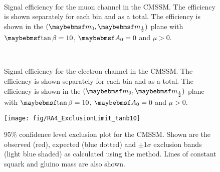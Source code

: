 \begin{figure}[h!]
\centering
{}
\\
\caption[Signal efficiency for the muon channel in the \ac{CMSSM}]{Signal
  efficiency for the muon channel in the \ac{CMSSM}. The efficiency is shown
  separately for each \STlep bin and as a total. The efficiency is shown in the
  $(\Mzero, \Mhalf)$ plane with $\tanbeta=10$, $\Azero=0$ and $\mu > 0$.}
\label{fig:inter_msugra_mu}
\end{figure}

\begin{figure}[h!]
\centering
{}
\\
\caption[Signal efficiency for the electron channel in the \ac{CMSSM}]{Signal
  efficiency for the electron channel in the \ac{CMSSM}. The efficiency is shown
  separately for each \STlep bin and as a total. The efficiency is shown in the
  $(\Mzero, \Mhalf)$ plane with $\tanbeta=10$, $\Azero=0$ and $\mu > 0$.}
\label{fig:inter_msugra_el}
\end{figure}

\begin{figure}[h!]
\texttt{[image: fig/RA4\_ExclusionLimit\_tanb10]}
\caption[95\% confidence level exclusion plot for the \ac{CMSSM}]{95\% confidence level exclusion plot for the
  \ac{CMSSM}. Shown are the observed (red), expected (blue dotted) and $\pm
  1\sigma$ exclusion bands (light blue shaded) as calculated using the \CLs
  method. Lines of constant squark and gluino mass are also shown.}
\label{fig:inter_msugra_exclusion}
\end{figure}


